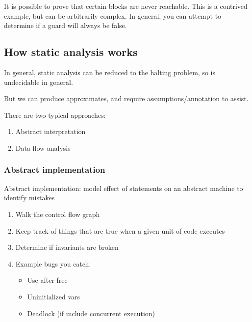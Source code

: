 \documentclass{article}
\begin{document}
It is possible to prove that certain blocks are never reachable. This is a contrived example, but can be arbitrarily complex. In general, you can attempt to determine if a guard will always be false. 

\subsection{How static analysis works}

In general, static analysis can be reduced to the halting problem, so is undecidable in general. 

\vspace*{1em}

But we can produce approximates, and require assumptions/annotation to assist.

\vspace*{1em}

There are two typical approaches:
\begin{enumerate}
    \item Abstract interpretation
    \item Data flow analysis
\end{enumerate}

\subsubsection{Abstract implementation}
Abstract implementation: model effect of statements on an abstract machine to identify mistakes

\begin{enumerate}
    \item Walk the control flow graph 
    \item Keep track of things that are true when a given unit of code executes 
    \item Determine if invariants are broken 
    \item Example bugs you catch:
    \begin{itemize}
        \item Use after free 
        \item Uninitialized vars 
        \item Deadlock (if include concurrent execution)
    \end{itemize}
\end{enumerate}
\end{document}
